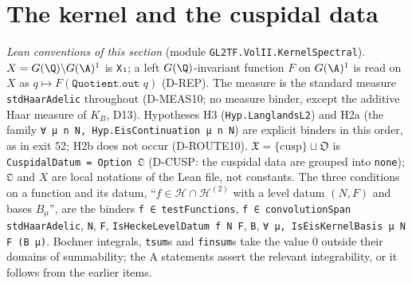 \section{The kernel and the cuspidal data}\label{sec:kernel-spectral}

\noindent\emph{Lean conventions of this section} (module \texttt{GL2TF.VolII.KernelSpectral}). $X=G(\Q)\backslash G(\A)^1$ is \texttt{X₁}; a left $G(\Q)$-invariant function $F$ on $G(\A)^1$ is read on $X$ as $q\mapsto F(\texttt{Quotient.out }q)$ (D-REP). The measure is the standard measure \texttt{stdHaarAdelic} throughout (D-MEAS10; no measure binder, except the additive Haar measure of $K_B$, D13). Hypotheses H3 (\texttt{Hyp.LanglandsL2}) and H2a (the family \texttt{∀ μ n N, Hyp.EisContinuation μ n N}) are explicit binders in this order, as in exit 52; H2b does not occur (D-ROUTE10). $\mathfrak X=\{\mathrm{cusp}\}\sqcup\mathfrak O$ is \texttt{CuspidalDatum = Option 𝔒} (D-CUSP: the cuspidal data are grouped into \texttt{none}); \texttt{𝔒} and $X$ are local notations of the Lean file, not constants. The three conditions on a function and its datum, ``$f\in\mathcal H\cap\mathcal H^{(2)}$ with a level datum $(N,F)$ and bases $B_\mu$'', are the binders \texttt{f ∈ testFunctions}, \texttt{f ∈ convolutionSpan stdHaarAdelic}, \texttt{N}, \texttt{F}, \texttt{IsHeckeLevelDatum f N F}, \texttt{B}, \texttt{∀ μ, IsEisKernelBasis μ N F (B μ)}. Bochner integrals, \texttt{tsum}s and \texttt{finsum}s take the value $0$ outside their domains of summability; the A statements assert the relevant integrability, or it follows from the earlier items.

